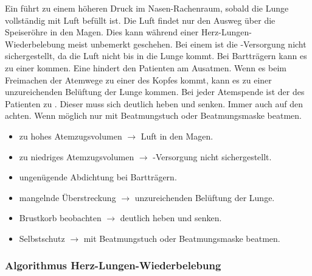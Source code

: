 {
Ein  führt zu einem
höheren Druck im Nasen-Rachenraum, sobald die Lunge
vollständig mit Luft befüllt ist. Die Luft findet nur den
Ausweg über die Speiseröhre in den Magen. Dies kann während einer Herz-Lungen-Wiederbelebung meist unbemerkt geschehen. Bei einem  ist die
-Versorgung nicht sichergestellt, da die Luft nicht bis in die
Lunge kommt. Bei Bartträgern kann es zu einer
 kommen. Eine  hindert den Patienten am Ausatmen. Wenn es beim Freimachen
der Atemwege zu einer  des Kopfes
kommt, kann es zu einer unzureichenden Belüftung der Lunge kommen. Bei jeder Atemspende ist der  des Patienten zu . Dieser
muss sich deutlich heben und senken. Immer auch auf den 
achten. Wenn möglich nur mit Beatmungstuch oder Beatmungsmaske beatmen.
}{
\begin{itemize}
  \item zu hohes Atemzugsvolumen ${\rightarrow}$ Luft in den Magen.
  \item zu niedriges Atemzugsvolumen ${\rightarrow}$ -Versorgung nicht
  sichergestellt.
  \item ungenügende Abdichtung bei Bartträgern.
  \item mangelnde Überstreckung ${\rightarrow}$ unzureichenden Belüftung der
  Lunge.
  \item Brustkorb beobachten ${\rightarrow}$ deutlich heben und senken.
  \item Selbstschutz ${\rightarrow}$ mit Beatmungstuch oder Beatmungsmaske
  beatmen.
\end{itemize}
}{}{}{}

\subsubsection{Algorithmus Herz-Lungen-Wiederbelebung}



